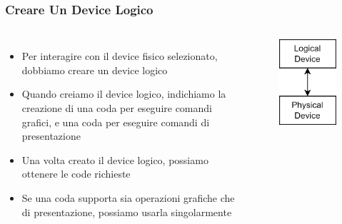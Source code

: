 \begin{frame}
\frametitle{Creare Un Device Logico}
\begin{columns}


\begin{itemize}
\item Per interagire con il device fisico selezionato, dobbiamo creare un device logico
\item Quando creiamo il device logico, indichiamo la creazione di una coda per eseguire comandi grafici, e una coda per eseguire comandi di presentazione
\item Una volta creato il device logico, possiamo ottenere le code richieste
\item Se una coda supporta sia operazioni grafiche che di presentazione, possiamo usarla singolarmente
\end{itemize}


\begin{figure}[ht]
    \centering
    \includegraphics[scale=0.2]{images/SlidesInitializingVulkan/LogicalDevice.png}
\end{figure}

\end{columns}
\end{frame}
